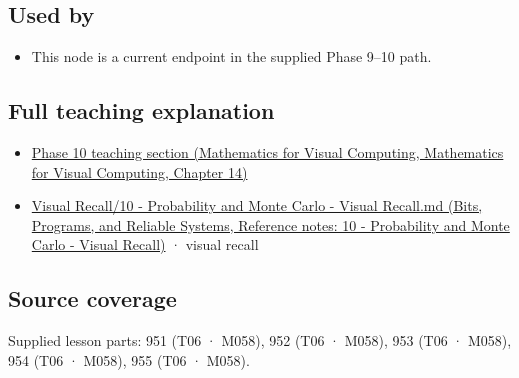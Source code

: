 \subsection{Used by}\label{appendix-33237f0f618b-used-by}

\begin{itemize}
\tightlist
\item
  This node is a current endpoint in the supplied Phase 9--10 path.
\end{itemize}

\subsection{Full teaching explanation}\label{appendix-33237f0f618b-full-teaching-explanation}

\begin{itemize}
\tightlist
\item
  \href{../02-Mathematics-for-Visual-Computing/main.pdf\#nameddest=02-foundations-ii-ch030-finite-samples-need-stable-descriptive-statistics}{Phase 10 teaching section (Mathematics for Visual Computing, Mathematics for Visual Computing, Chapter 14)}
\item
  \href{../01-Bits-Programs-and-Reliable-Systems/main.pdf\#nameddest=appendix-cb5af353ef77}{Visual Recall/10 - Probability and Monte Carlo - Visual Recall.md (Bits, Programs, and Reliable Systems, Reference notes: 10 - Probability and Monte Carlo - Visual Recall)} · visual recall
\end{itemize}

\subsection{Source coverage}\label{appendix-33237f0f618b-source-coverage}

Supplied lesson parts: 951 (T06 · M058), 952 (T06 · M058), 953 (T06 · M058), 954 (T06 · M058), 955 (T06 · M058).
